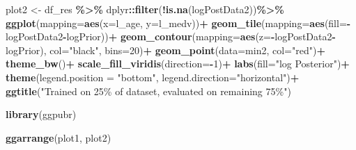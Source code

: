 \documentclass[
]{article}
\newenvironment{Shaded}{\begin{snugshade}}{\end{snugshade}}
\newcommand{\AttributeTok}[1]{\textcolor[rgb]{0.13,0.29,0.53}{#1}}
\newcommand{\DecValTok}[1]{\textcolor[rgb]{0.00,0.00,0.81}{#1}}
\newcommand{\FunctionTok}[1]{\textcolor[rgb]{0.13,0.29,0.53}{\textbf{#1}}}
\newcommand{\NormalTok}[1]{#1}
\newcommand{\OtherTok}[1]{\textcolor[rgb]{0.56,0.35,0.01}{#1}}
\newcommand{\SpecialCharTok}[1]{\textcolor[rgb]{0.81,0.36,0.00}{\textbf{#1}}}
\newcommand{\StringTok}[1]{\textcolor[rgb]{0.31,0.60,0.02}{#1}}
\begin{document}
\begin{Shaded}
\begin{Highlighting}[]
\NormalTok{plot2 }\OtherTok{\textless{}{-}}\NormalTok{ df\_res }\SpecialCharTok{\%\textgreater{}\%}
\NormalTok{  dplyr}\SpecialCharTok{::}\FunctionTok{filter}\NormalTok{(}\SpecialCharTok{!}\FunctionTok{is.na}\NormalTok{(logPostData2))}\SpecialCharTok{\%\textgreater{}\%}
  \FunctionTok{ggplot}\NormalTok{(}\AttributeTok{mapping=}\FunctionTok{aes}\NormalTok{(}\AttributeTok{x=}\NormalTok{l\_age, }\AttributeTok{y=}\NormalTok{l\_medv))}\SpecialCharTok{+}
  \FunctionTok{geom\_tile}\NormalTok{(}\AttributeTok{mapping=}\FunctionTok{aes}\NormalTok{(}\AttributeTok{fill=}\SpecialCharTok{{-}}\NormalTok{logPostData2}\SpecialCharTok{{-}}\NormalTok{logPrior))}\SpecialCharTok{+}
  \FunctionTok{geom\_contour}\NormalTok{(}\AttributeTok{mapping=}\FunctionTok{aes}\NormalTok{(}\AttributeTok{z=}\SpecialCharTok{{-}}\NormalTok{logPostData2}\SpecialCharTok{{-}}\NormalTok{logPrior), }\AttributeTok{col=}\StringTok{"black"}\NormalTok{, }\AttributeTok{bins=}\DecValTok{20}\NormalTok{)}\SpecialCharTok{+}
  \FunctionTok{geom\_point}\NormalTok{(}\AttributeTok{data=}\NormalTok{min2, }\AttributeTok{col=}\StringTok{"red"}\NormalTok{)}\SpecialCharTok{+}
  \FunctionTok{theme\_bw}\NormalTok{()}\SpecialCharTok{+}
  \FunctionTok{scale\_fill\_viridis}\NormalTok{(}\AttributeTok{direction=}\SpecialCharTok{{-}}\DecValTok{1}\NormalTok{)}\SpecialCharTok{+}
  \FunctionTok{labs}\NormalTok{(}\AttributeTok{fill=}\StringTok{"log Posterior"}\NormalTok{)}\SpecialCharTok{+}
  \FunctionTok{theme}\NormalTok{(}\AttributeTok{legend.position =} \StringTok{"bottom"}\NormalTok{,}
        \AttributeTok{legend.direction=}\StringTok{"horizontal"}\NormalTok{)}\SpecialCharTok{+}
  \FunctionTok{ggtitle}\NormalTok{(}\StringTok{"Trained on 25\% of dataset, evaluated on remaining 75\%"}\NormalTok{)}

\FunctionTok{library}\NormalTok{(ggpubr)}

\FunctionTok{ggarrange}\NormalTok{(plot1, plot2)}
\end{Highlighting}
\end{Shaded}
\end{document}
